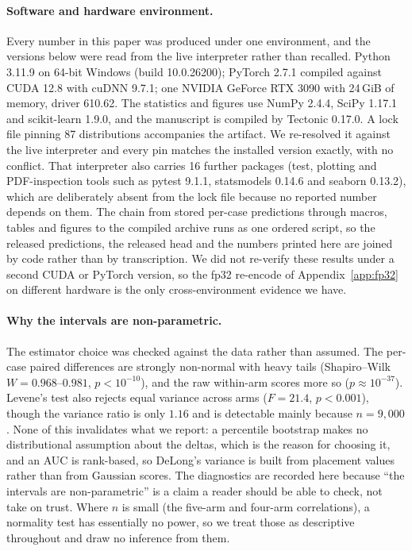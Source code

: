 \documentclass{article}
\begin{document}
\paragraph{Software and hardware environment.} Every number in this paper was
produced under one environment, and the versions below were read from the live
interpreter rather than recalled. Python 3.11.9 on 64-bit Windows (build
10.0.26200); PyTorch 2.7.1 compiled against CUDA 12.8 with cuDNN 9.7.1; one
NVIDIA GeForce RTX 3090 with 24\,GiB of memory, driver 610.62. The statistics and
figures use NumPy 2.4.4, SciPy 1.17.1 and scikit-learn 1.9.0, and the manuscript
is compiled by Tectonic 0.17.0. A lock file pinning 87 distributions accompanies
the artifact. We re-resolved it against the live interpreter and every pin
matches the installed version exactly, with no conflict. That interpreter also
carries 16 further packages (test, plotting and PDF-inspection tools such as
pytest 9.1.1, statsmodels 0.14.6 and seaborn 0.13.2), which are deliberately
absent from the lock file because no reported number depends on them. The chain
from stored per-case predictions through macros, tables and figures to the
compiled archive runs as one ordered script, so the released predictions, the
released head and the numbers printed here are joined by code rather than by
transcription. We did not re-verify these results under a second CUDA or PyTorch
version, so the fp32 re-encode of Appendix~\ref{app:fp32} on different hardware
is the only cross-environment evidence we have.

\paragraph{Why the intervals are non-parametric.} The estimator choice was
checked against the data rather than assumed. The per-case paired differences are
strongly non-normal with heavy tails (Shapiro--Wilk $W=0.968$--$0.981$,
$p<10^{-10}$), and the raw within-arm scores more so ($p\approx10^{-37}$).
Levene's test also rejects equal variance across arms ($F=21.4$, $p<0.001$),
though the variance ratio is only $1.16$ and is detectable mainly because
$n=9{,}000$. None of this invalidates what we report: a percentile bootstrap
makes no distributional assumption about the deltas, which is the reason for
choosing it, and an AUC is rank-based, so DeLong's variance is built from
placement values rather than from Gaussian scores. The diagnostics are recorded
here because ``the intervals are non-parametric'' is a claim a reader should be
able to check, not take on trust. Where $n$ is small (the five-arm and
four-arm correlations), a normality test has essentially no power, so we treat
those as descriptive throughout and draw no inference from them.
\end{document}
